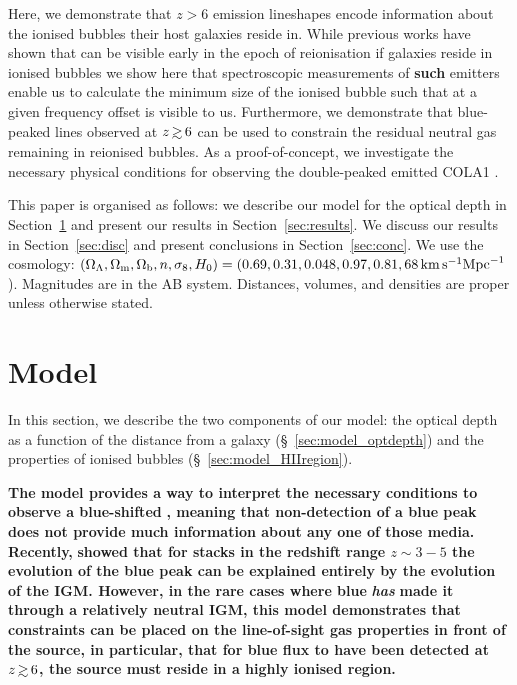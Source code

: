 \documentclass[fleqn,usenatbib]{mnras}
\providecommand{\DIFadd}[1]{{\protect\color{Green} {\bf #1}}} %
\providecommand{\DIFaddbegin}{} %
\providecommand{\DIFaddend}{} %
\newcommand{\DIFaddincludegraphics}[2][]{{\color{purple}\fbox{\DIFOincludegraphics[#1]{#2}}}} %
\DeclareRobustCommand{\DIFaddbegin}{\DIFOaddbegin \let\includegraphics\DIFaddincludegraphics} %
\DeclareRobustCommand{\DIFaddend}{\DIFOaddend \let\includegraphics\DIFOincludegraphics} %
\begin{document}
Here, we demonstrate that $z>6$ \lya emission lineshapes encode information about the ionised bubbles their host galaxies reside in. While previous works have shown that \lya can be visible early in the epoch of reionisation if galaxies reside in ionised bubbles \citep{Haiman2002,Mason2018b} we show here that spectroscopic measurements of \DIFaddbegin \DIFadd{such }\DIFaddend \lya emitters enable us to calculate the minimum size of the ionised bubble such that \lya at a given frequency offset is visible to us. 
Furthermore, we demonstrate that blue-peaked \lya lines observed at $z\simgt6$ can be used to constrain the residual neutral gas remaining in reionised bubbles. As a proof-of-concept, we investigate the necessary physical conditions for observing the double-peaked \lya emitted COLA1 \citep{Hu2016,Matthee2018b}.

This paper is organised as follows: we describe our model for the \lya optical depth in Section~\ref{sec:model} and present our results in Section~\ref{sec:results}. We discuss our results in Section~\ref{sec:disc} and present conclusions in Section~\ref{sec:conc}. We use the \citet{PlanckCollaboration2015} cosmology: $(\OL, \Om, \Ob, n,  \sigma_8, H_0) = (0.69, 0.31, 0.048, 0.97, 0.81, 68 \kms \mathrm{Mpc}^{-1}$). Magnitudes are in the AB system. Distances, volumes, and densities are proper unless otherwise stated.

\section{Model}
\label{sec:model}
In this section, we describe the two components of our model: the \lya optical depth as a function of the distance from a galaxy (\S~\ref{sec:model_optdepth}) and the properties of ionised bubbles (\S~\ref{sec:model_HIIregion}).

\DIFaddbegin \DIFadd{The model provides a way to interpret the necessary conditions to observe a blue-shifted }\lya \DIFadd{peak emerging from a galaxy at $z\simgt6$. Of course, there are numerous scattering processes in the ISM, CGM and IGM which can absorb a blue peak at any redshift }\citep[e.g.,][]{Gunn1965,Zheng2010,Laursen2011}\DIFadd{, meaning that non-detection of a blue peak does not provide much information about any one of those media. Recently, }\citet{Hayes2020} \DIFadd{showed
that for stacks in the redshift range $z\sim 3-5$ the evolution of the blue peak can be explained entirely by the evolution of the IGM.
However, in the rare cases where blue }\lya \DIFadd{flux }\textit{\DIFadd{has}} \DIFadd{made it through a relatively neutral IGM, this model demonstrates that constraints can be placed on the line-of-sight gas properties in front of the source, in particular, that for blue flux to have been detected at $z\simgt6$, the source must reside in a highly ionised region.
}
\end{document}
